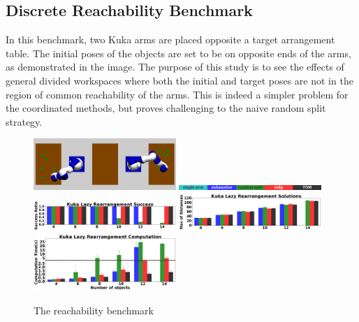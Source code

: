 \subsection{Discrete Reachability Benchmark}
In this benchmark, two Kuka arms are placed opposite a target arrangement table. The initial poses of the objects are set to be on opposite ends of the arms, as demonstrated in the image. The purpose of this study is to see the effects of general divided workspaces where both the initial and target poses are not in the region of common reachability of the arms. This is indeed a simpler problem for the coordinated methods, but proves challenging to the naive random split strategy. 

\begin{figure}[h]
	\centering
	\includegraphics[width=0.48\textwidth]{figures/reachability}
	\includegraphics[width=0.48\textwidth]{figures/results/labels}
	\includegraphics[width=0.48\textwidth]{figures/results/5_kuka_lazy_ms_success.png}
	\includegraphics[width=0.48\textwidth]{figures/results/5_kuka_lazy_ms_cost.png}
	\includegraphics[width=0.48\textwidth]{figures/results/5_kuka_lazy_ms_time.png}
	\caption{The reachability benchmark}
	\label{fig:reachability_benchmark}
\end{figure}



% 

% 













